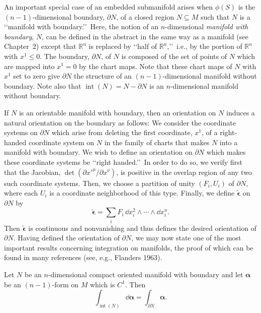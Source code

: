 An important special case of an embedded submanifold arises when \(\phi(S)\) is the
\((n-1)\)-dimensional boundary, \(\partial N\), of a closed region
\(N\subseteq M\) such that \(N\) is a \lq\lq manifold with boundary.\rq\rq\ Here,
the notion of an \(n\)-dimensional \emph{manifold with boundary}, \(N\), can be
defined in the abstract in the same way as a manifold (see Chapter~2) except that
\(\mathbb R^n\) is replaced by \lq\lq half of \(\mathbb R^n\),\rq\rq\ i.e., by the
portion of \(\mathbb R^n\) with \(x^1\leq0\). The boundary, \(\partial N\), of \(N\)
is composed of the set of points of \(N\) which are mapped into \(x^1=0\) by the
chart maps. Note that these chart maps of \(N\) with \(x^1\) set to zero give
\(\partial N\) the structure of an \((n-1)\)-dimensional manifold without boundary.
Note also that \(\operatorname{int}(N)=N-\partial N\) is an \(n\)-dimensional
manifold without boundary.

If \(N\) is an orientable manifold with boundary, then an orientation on \(N\)
induces a natural orientation on the boundary as follows: We consider the coordinate
systems on \(\partial N\) which arise from deleting the first coordinate, \(x^1\), of
a right-handed coordinate system on \(N\) in the family of charts that makes \(N\)
into a manifold with boundary. We wish to define an orientation on \(\partial N\)
which makes these coordinate systems be \lq\lq right handed.\rq\rq\ In order to do
so, we verify first that the Jacobian,
\(\det(\partial x'^\mu/\partial x^\nu)\), is positive in the overlap region of any
two such coordinate systems. Then, we choose a partition of unity
\((F_i,U_i)\) of \(\partial N\), where each \(U_i\) is a coordinate neighborhood of
this type. Finally, we define \(\widetilde{\boldsymbol\epsilon}\) on \(\partial N\)
by
\[
  \widetilde{\boldsymbol\epsilon}
  =\sum_iF_i\,\dd x_i^2\wedge\cdots\wedge \dd x_i^n.
\]
Then \(\widetilde{\boldsymbol\epsilon}\) is continuous and nonvanishing and thus
defines the desired orientation of \(\partial N\). Having defined the orientation of
\(\partial N\), we may now state one of the most important results concerning
integration on manifolds, the proof of which can be found in many references (see,
e.g., Flanders 1963).

\renewcommand{\thetheorem}{B.2.\arabic{theorem}}
\setcounter{theorem}{0}
\begin{theorem}\label{thm:B.2.1}
Let \(N\) be an \(n\)-dimensional compact oriented manifold with boundary and let
\(\boldsymbol\alpha\) be an \((n-1)\)-form on \(M\) which is \(C^1\). Then
\begin{equation}
  \int_{\operatorname{int}(N)}\dd\boldsymbol\alpha
  =\int_{\partial N}\boldsymbol\alpha.
  \tag{B.2.7}\label{eq:B.2.7}
\end{equation}
\end{theorem}

